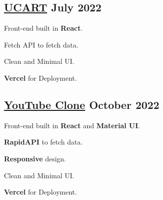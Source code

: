 \subsection{{\href{https://cart-topaz.vercel.app/}{UCART} \hfill July 2022}}
\begin{zitemize}
\item Front-end built in \textbf{React}.
\item Fetch API to fetch data.
\item Clean and Minimal UI.
\item \textbf{Vercel} for Deployment.
\end{zitemize}



\subsection{{\href{https://youtubee.vercel.app/}{YouTube Clone} \hfill October 2022}}
\begin{zitemize}
\item Front-end built in \textbf{React} and \textbf{Material UI}.
\item  \textbf{RapidAPI} to fetch data.
\item  \textbf{Responsive} design.
\item Clean and Minimal UI.
\item \textbf{Vercel} for Deployment.
\end{zitemize}
